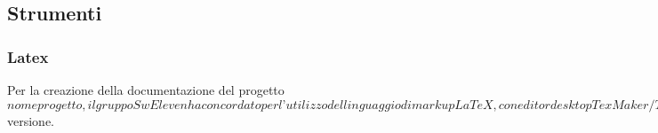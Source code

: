 \subsection{Strumenti}
\subsubsection{Latex}
Per la creazione della documentazione del progetto $nomeprogetto, il gruppo SwEleven ha concordato per l’utilizzo del linguaggio di markup LaTeX, con editor desktop TexMaker/TexShop e compilatore LatexMK aggiornato alla versione $versione.

